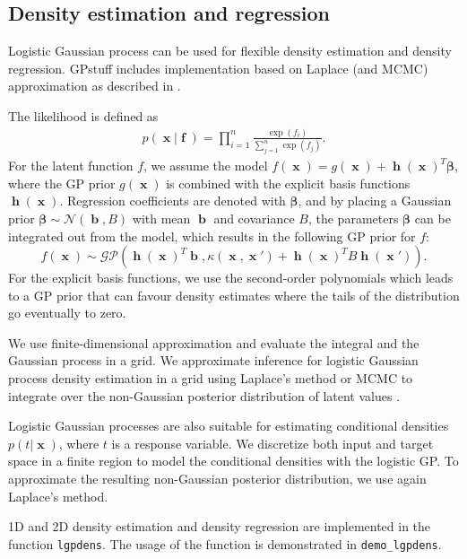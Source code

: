 \documentclass[twoside,11pt]{article}
\DeclareMathOperator{\x}{\mathbf{x}}
\DeclareMathOperator{\f}{\mathbf{f}}
\DeclareMathOperator{\h}{\mathbf{h}}
\DeclareMathOperator{\bb}{\mathbf{b}}
\newcommand{\pkg}[1]{{\fontseries{b}\selectfont #1}}
\newcommand{\code}[1]{{\normalfont\texttt{#1}}}
\begin{document}
\subsection{Density estimation and regression}

Logistic Gaussian process can be used for flexible density estimation
and density regression. \pkg{GPstuff} includes implementation based on
Laplace (and MCMC) approximation as described in
\citep{Riihimaki+Vehtari:2012}.

The likelihood is defined as
\begin{align}
  p(\x|\f)=\prod_{i=1}^n \frac{\exp(f_i)}{\sum_{j=1}^n \exp(f_j)}.
\end{align}
For the latent function $f$, we assume
the model $f(\x) = g(\x)+\h(\x)^T \bm{\beta}$, where the GP prior
$g(\x)$ is combined with the explicit basis functions $\h(\x)$.
Regression coefficients are denoted with $\bm{\beta}$, and by placing
a Gaussian prior $\bm{\beta}\sim \mathcal{N}(\bb,B)$ with mean $\bb$
and covariance $B$, the parameters $\bm{\beta}$ can be integrated out
from the model, which results in the following GP prior for $f$:
\begin{equation}\label{gp_process}
  f(\x)\sim \mathcal{GP}\left(\h(\x)^T\bb,\kappa(\x,\x')+\h(\x)^TB\h(\x')\right).
\end{equation}
%
For the explicit basis functions, we use the second-order polynomials
%
%
which leads to a GP prior that can favour density estimates where the
tails of the distribution go eventually to zero.

We use finite-dimensional approximation and evaluate the integral and
the Gaussian process in a grid.
%
We approximate inference for logistic Gaussian process density
estimation in a grid using Laplace's method or MCMC to integrate over
the non-Gaussian posterior distribution of latent values \citep[see
details in][]{Riihimaki+Vehtari:2012}.

Logistic Gaussian processes are also suitable for estimating
conditional densities $p(t|\x)$, where $t$ is a response variable. We
discretize both input and target space in a finite region to model the
conditional densities with the logistic GP.
%
To approximate the resulting non-Gaussian posterior distribution, we
use again Laplace's method.

1D and 2D density estimation and density regression are implemented in
the function \code{lgpdens}. The usage of the function is demonstrated
in \code{demo\_lgpdens}.
\end{document}
